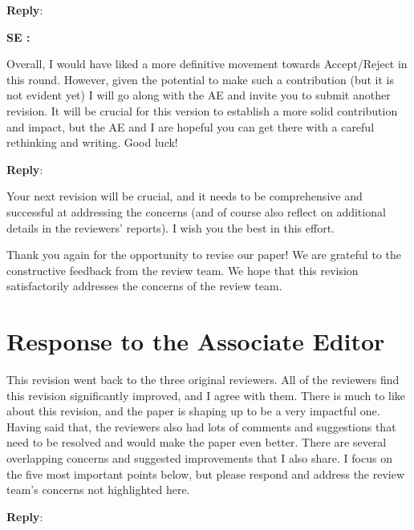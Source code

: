 \documentclass[11pt]{article}
\newcounter{se}[section]
\newenvironment{se}[1][]{%
    \refstepcounter{se}\par\medskip\noindent%
    \textbf{SE \these: #1}\rmfamily\itshape%
}{\medskip}
\newenvironment{se*}[1][]{%
    \par\medskip%
    \rmfamily\itshape%
}{\medskip}
\newcounter{reviewer}
\newcounter{point}[reviewer]
\newcommand{\aesection}
{\newpage
\section*{Response to the Associate Editor}}
\newenvironment{reply}
 {\par\medskip \noindent \begin{sf}\textbf{Reply}:\ }
 {\medskip \end{sf}}
\begin{document}
\begin{reply}

\end{reply}


\begin{se}
Overall, I would have liked a more definitive movement towards Accept/Reject in this round. However, given the potential to make such a contribution (but it is not evident yet) I will go along with the AE and invite you to submit another revision. It will be crucial for this version to establish a more solid contribution and impact, but the AE and I are hopeful you can get there with a careful rethinking and writing. Good luck!

\end{se}

\begin{reply}

\end{reply}


\begin{se*}

Your next revision will be crucial, and it needs to be comprehensive and successful at addressing the concerns (and of course also reflect on additional details in the reviewers' reports). I wish you the best in this effort.

\end{se*}


\vspace*{0.5\baselineskip}

\textsf{Thank you again for the opportunity to revise our paper! We are grateful to the constructive feedback from the review team. We hope that this revision satisfactorily addresses the concerns of the review team.}

\aesection{}
\begin{se*}
This revision went back to the three original reviewers. All of the reviewers find this revision significantly improved, and I agree with them. There is much to like about this revision, and the paper is shaping up to be a very impactful one. Having said that, the reviewers also had lots of comments and suggestions that need to be resolved and would make the paper even better. There are several overlapping concerns and suggested improvements that I also share. I focus on the five most important points below, but please respond and address the review team's concerns not highlighted here.
\end{se*}

\begin{reply}

\end{reply}
\end{document}
